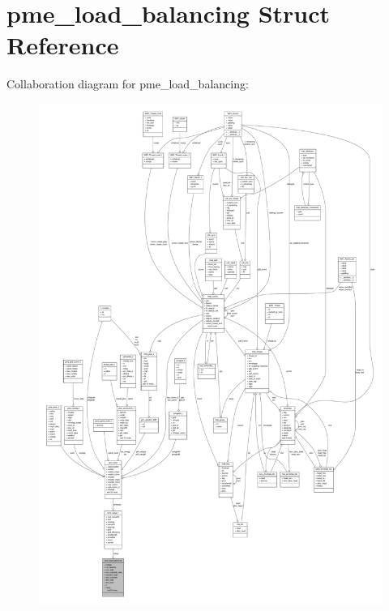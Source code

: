 \hypertarget{structpme__load__balancing}{\section{pme\-\_\-load\-\_\-balancing \-Struct \-Reference}
\label{structpme__load__balancing}
}


\-Collaboration diagram for pme\-\_\-load\-\_\-balancing\-:
\nopagebreak
\begin{figure}[H]
\begin{center}
\leavevmode
\includegraphics[width=350pt]{structpme__load__balancing__coll__graph}
\end{center}
\end{figure}
